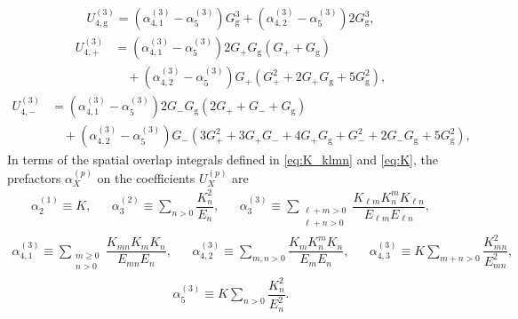 \documentclass[preprint,showkeys,nofootinbib]{revtex4-1}
\newcommand{\f}{\dfrac} %
\newcommand{\p}[1]{\left(#1\right)} %
\newcommand{\g}{\text{g}}
\newcommand{\n}{\hat{n}}
\newcommand{\1}{\mathds{1}}
\begin{document}
\begin{align}
  U_{4,\g}^{(3)}
  = \p{\alpha_{4,1}^{(3)} - \alpha_5^{(3)}} G_\g^3
  + \p{\alpha_{4,2}^{(3)} - \alpha_5^{(3)}} 2 G_\g^3,
\end{align}
\begin{align}
  U_{4,+}^{(3)}
  &= \p{\alpha_{4,1}^{(3)} - \alpha_5^{(3)}}
  2 G_+ G_\g \p{G_+ + G_\g} \nonumber \\
  &\quad + \p{\alpha_{4,2}^{(3)} - \alpha_5^{(3)}}
  G_+ \p{G_+^2 + 2 G_+ G_\g + 5 G_\g^2},
\end{align}
\begin{align}
  U_{4,-}^{(3)}
  &= \p{\alpha_{4,1}^{(3)} - \alpha_5^{(3)}}
  2 G_- G_\g \p{2 G_+ + G_- + G_\g} \nonumber \\
  &\quad + \p{\alpha_{4,2}^{(3)} - \alpha_5^{(3)}}
  G_- \p{3 G_+^2 + 3 G_+ G_- + 4 G_+ G_\g + G_-^2
    + 2 G_- G_\g + 5 G_\g^2},
\end{align}
In terms of the spatial overlap integrals defined in \eqref{eq:K_klmn}
and \eqref{eq:K}, the prefactors $\alpha_X^{(p)}$ on the coefficients
$U_X^{(p)}$ are
\begin{align}
  \alpha_2^{(1)} \equiv K,
  &&
  \alpha_3^{(2)} \equiv \sum_{n>0} \f{K_n^2}{E_n},
  &&
  \alpha_3^{(3)} \equiv \sum_{\substack{\ell+m>0\\\ell+n>0}}
  \f{K_{\ell m} K^m_n K_{\ell n}}{E_{\ell m} E_{\ell n}},
\end{align}
\begin{align}
  \alpha_{4,1}^{(3)}
  \equiv \sum_{\substack{m\ge0\\n>0}} \f{K_{mn} K_m K_n}{E_{mn} E_n},
  &&
  \alpha_{4,2}^{(3)}
  \equiv \sum_{m,n>0} \f{K_m K^m_n K_n}{E_m E_n},
  &&
  \alpha_{4,3}^{(3)}
  \equiv K \sum_{m+n>0} \f{K_{mn}^2}{E_{mn}^2},
\end{align}
\begin{align}
  \alpha_5^{(3)}
  \equiv  K \sum_{n>0} \f{K_n^2}{E_n^2}.
\end{align}


\end{document}

